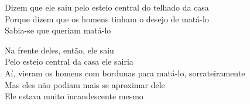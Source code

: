 \bigskip

\begin{linenumbers}\begingroup\raggedright
\noindent Dizem que ele saiu pelo esteio central do telhado da casa\\
Porque dizem que os homens tinham o desejo de matá-lo\\
Sabia-se que queriam matá-lo
\end{linenumbers}\endgroup

\bigskip

\begin{linenumbers}\begingroup\raggedright
\noindent Na frente deles, então, ele saiu\\
Pelo esteio central da casa ele sairia\\
Aí, vieram os homens com bordunas para matá-lo, sorrateiramente\\
Mas eles não podiam mais se aproximar dele\\
Ele estava muito incandescente mesmo
\end{linenumbers}\endgroup

\bigskip

